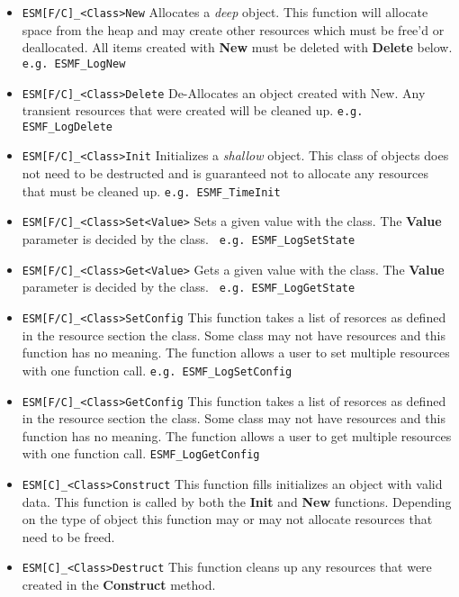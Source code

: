 \begin{itemize}
\item{\tt ESM[F/C]\_<Class>New} Allocates a {\it deep} object.  This
  function will allocate space from the heap and may create other
  resources which must be free'd or deallocated.  All items created
  with {\bf New} must be deleted with {\bf Delete} below.  {\tt e.g.
    ESMF\_LogNew}
  
\item{\tt ESM[F/C]\_<Class>Delete} De-Allocates an object created with
  New.  Any transient resources that were created will be cleaned up.
  {\tt e.g. ESMF\_LogDelete}
  
\item{\tt ESM[F/C]\_<Class>Init} Initializes a {\it shallow} object.
  This class of objects does not need to be destructed and is
  guaranteed not to allocate any resources that must be cleaned up.
  {\tt e.g. ESMF\_TimeInit}
  
\item{\tt ESM[F/C]\_<Class>Set<Value>} Sets a given value with the
  class.  The {\bf Value} parameter is decided by the class.  {\tt
    e.g. ESMF\_LogSetState}
  
\item{\tt ESM[F/C]\_<Class>Get<Value>} Gets a given value with the
  class.  The {\bf Value} parameter is decided by the class.  {\tt
    e.g. ESMF\_LogGetState}
  
\item{\tt ESM[F/C]\_<Class>SetConfig} This function takes a list of
  resorces as defined in the resource section the class.  Some class
  may not have resources and this function has no meaning.  The
  function allows a user to set multiple resources with one function
  call.  {\tt e.g. ESMF\_LogSetConfig}
  
\item{\tt ESM[F/C]\_<Class>GetConfig} This function takes a list of
  resorces as defined in the resource section the class.  Some class
  may not have resources and this function has no meaning.  The
  function allows a user to get multiple resources with one function
  call.  {\tt ESMF\_LogGetConfig}
  
\item{\tt ESM[C]\_<Class>Construct} This function fills initializes an
  object with valid data.  This function is called by both the {\bf
    Init} and {\bf New} functions.  Depending on the type of object
  this function may or may not allocate resources that need to be
  freed.
  
\item{\tt ESM[C]\_<Class>Destruct} This function cleans up any
  resources that were created in the {\bf Construct} method.

\end{itemize}

